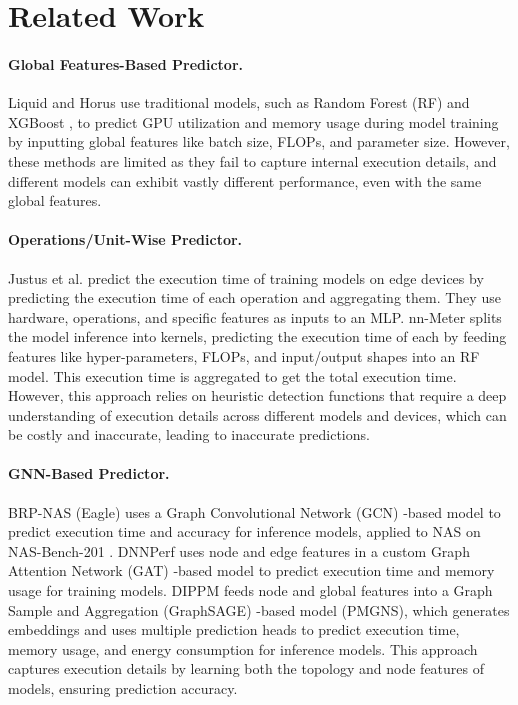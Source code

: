 \section{Related Work}
\label{sec:related work} 
\paragraph{Global Features-Based Predictor.} 
Liquid \cite{Liquid} and Horus \cite{Horus} use traditional models, such as Random Forest (RF) \cite{randomforest} and XGBoost \cite{Xgboost}, to predict GPU utilization and memory usage during model training by inputting global features like batch size, FLOPs, and parameter size. However, these methods are limited as they fail to capture internal execution details, and different models can exhibit vastly different performance, even with the same global features.

\paragraph{Operations/Unit-Wise Predictor.}
Justus et al. \cite{justus} predict the execution time of training models on edge devices by predicting the execution time of each operation and aggregating them. They use hardware, operations, and specific features as inputs to an MLP. nn-Meter \cite{Nn-meter} splits the model inference into kernels, predicting the execution time of each by feeding features like hyper-parameters, FLOPs, and input/output shapes into an RF model. This execution time is aggregated to get the total execution time. However, this approach relies on heuristic detection functions that require a deep understanding of execution details across different models and devices, which can be costly and inaccurate, leading to inaccurate predictions.

\paragraph{GNN-Based Predictor.}
BRP-NAS (Eagle) \cite{Brp-nas} uses a Graph Convolutional Network (GCN) \cite{GCN}-based model to predict execution time and accuracy for inference models, applied to NAS on NAS-Bench-201 \cite{nas-bench}. 
DNNPerf \cite{dnnperf} uses node and edge features in a custom Graph Attention Network (GAT) \cite{GAT}-based model to predict execution time and memory usage for training models. 
DIPPM \cite{DIPPM} feeds node and global features into a Graph Sample and Aggregation (GraphSAGE) \cite{GraphSage}-based model (PMGNS), which generates embeddings and uses multiple prediction heads to predict execution time, memory usage, and energy consumption for inference models. 
This approach captures execution details by learning both the topology and node features of models, ensuring prediction accuracy.